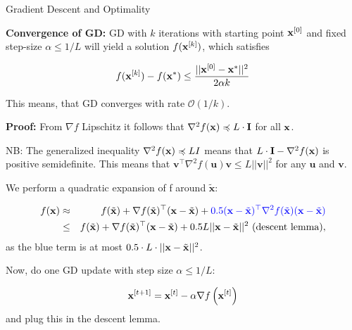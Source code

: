 \documentclass[11pt,compress,t,notes=noshow, xcolor=table]{beamer}
\begin{document}
\begin{vbframe}{Gradient Descent and Optimality}
	\lz 
		
	\textbf{Convergence of GD:} GD with $k$ iterations with starting point $\mathbf{x}^{[0]}$ and fixed step-size $\alpha \leq 1/L$ will yield a solution $f(\mathbf{x}^{[k]})$, which satisfies

	$$
		f(\mathbf{x}^{[k]}) - f(\mathbf{x}^\ast) \leq \frac{|| \mathbf{x}^{[0]} - \mathbf{x}^\ast ||^2}{2\alpha k}
	$$
	
	This means, that GD converges with rate $\mathcal{O}(1/k)$.
	

	\framebreak 	
	
	\textbf{Proof: }
	From $\nabla f$ Lipschitz it follows that $\nabla^2 f(\mathbf{x}) \preccurlyeq L \cdot \mathbf{I}$ for all $\mathbf{x}$. 

	\vspace*{0.2cm}

	\begin{footnotesize} NB: The generalized inequality $\nabla^2 f(\mathbf{x}) \preccurlyeq L I$ means that $L \cdot \mathbf{I} - \nabla^2 f(\mathbf{x})$ is positive semidefinite. This means that $ \bm{v} ^\top \nabla^2 f(\bm{u}) \bm{v} \leq L || \bm{v} ||^2$ for any $\bm{u}$ and $ \bm{v} $. 
	\end{footnotesize}
	
	\vspace*{0.2cm}

	We perform a quadratic expansion of f around $\tilde{\mathbf{x}}$:

	\begin{eqnarray*}
		f(\mathbf{x}) &\approx& f(\tilde{\mathbf{x}}) + \nabla f(\tilde{\mathbf{x}})^\top (\mathbf{x} - \tilde{\mathbf{x}}) + \textcolor{blue}{0.5  (\mathbf{x} - \tilde{\mathbf{x}})^\top \nabla^2 f(\tilde{\mathbf{x}}) (\mathbf{x} - \tilde{\mathbf{x}})} \\
		& \leq & f(\tilde{\mathbf{x}}) + \nabla f(\tilde{\mathbf{x}})^\top (\mathbf{x} - \tilde{\mathbf{x}}) + 0.5 L ||\mathbf{x} - \tilde{\mathbf{x}}||^2 \text{ (descent lemma)},
	\end{eqnarray*}		
	as the blue term is at most $0.5 \cdot L \cdot ||\mathbf{x} - \tilde{\mathbf{x}}||^2$. 
	
	\lz 

	Now, do one GD update with step size $\alpha \leq 1/L$: 

	$$
	\mathbf{x}^{[t+1]} = \mathbf{x}^{[t]} - \alpha \nabla f\left(\mathbf{x}^{[t]}\right)
	$$ 
	and plug this in the descent lemma.
		

	\framebreak 	

	\begin{footnotesize}
	

\end{footnotesize}
\end{vbframe}
\end{document}
